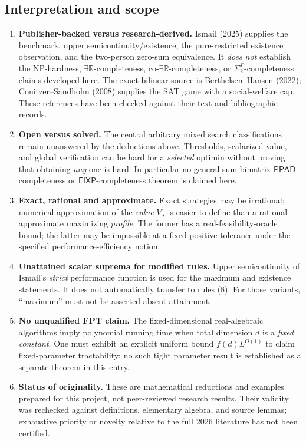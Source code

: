 \documentclass[11pt,a4paper]{article}
\providecommand{\ER}{\exists\mathbb R}
\providecommand{\coER}{\mathrm{co}\text{-}\exists\mathbb R}
\providecommand{\PPAD}{\mathsf{PPAD}}
\providecommand{\FIXP}{\mathsf{FIXP}}
\begin{document}
\subsection*{Interpretation and scope}\label{optimin:sec:audit}
\begin{enumerate}[label=\arabic*.,leftmargin=2em,itemsep=4pt]
\item \textbf{Publisher-backed versus research-derived.} Ismail (2025) supplies the benchmark, upper semicontinuity/existence, the pure-restricted existence observation, and the two-person zero-sum equivalence. It \emph{does not} establish the NP-hardness, $\ER$-completeness, $\coER$-completeness, or $\Sigma_2^P$-completeness claims developed here. The exact bilinear source is Berthelsen--Hansen (2022); Conitzer--Sandholm (2008) supplies the SAT game with a social-welfare cap. These references have been checked against their text and bibliographic records.
\item \textbf{Open versus solved.} The central arbitrary mixed search classifications remain unanswered by the deductions above. Thresholds, scalarized value, and global verification can be hard for a \emph{selected} optimin without proving that obtaining \emph{any} one is hard. In particular no general-sum bimatrix $\PPAD$-completeness or $\FIXP$-completeness theorem is claimed here.
\item \textbf{Exact, rational and approximate.} Exact strategies may be irrational; numerical approximation of the \emph{value} $V_\lambda$ is easier to define than a rational approximate maximizing \emph{profile}. The former has a real-feasibility-oracle bound; the latter may be impossible at a fixed positive tolerance under the specified performance-efficiency notion.
\item \textbf{Unattained scalar suprema for modified rules.} Upper semicontinuity of Ismail's \emph{strict} performance function is used for the maximum and existence statements. It does not automatically transfer to rules (8). For those variants, ``maximum'' must not be asserted absent attainment.
\item \textbf{No unqualified FPT claim.} The fixed-dimensional real-algebraic algorithms imply polynomial running time when total dimension $d$ is a \emph{fixed constant}. One must exhibit an explicit uniform bound $f(d)L^{O(1)}$ to claim fixed-parameter tractability; no such tight parameter result is established as a separate theorem in this entry.
\item \textbf{Status of originality.} These are mathematical reductions and examples prepared for this project, not peer-reviewed research results. Their validity was rechecked against definitions, elementary algebra, and source lemmas; exhaustive priority or novelty relative to the full 2026 literature has not been certified.
\end{enumerate}
\end{document}

